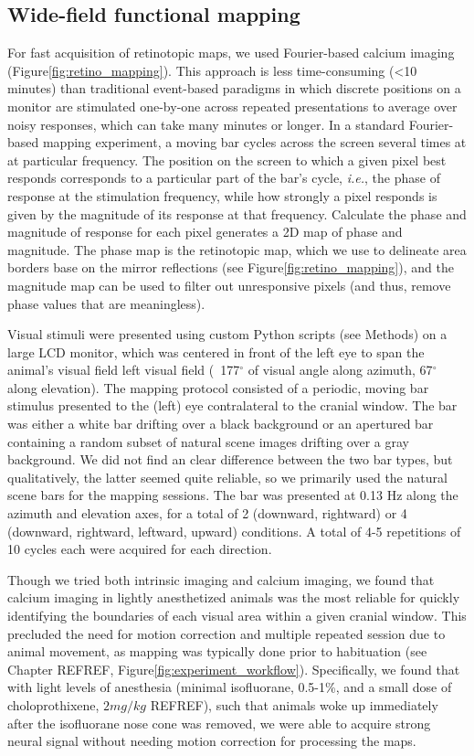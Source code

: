 \subsection{Wide-field functional mapping}
For fast acquisition of retinotopic maps, we used Fourier-based calcium imaging\cite{Kalatsky2003} (Figure\ref{fig:retino_mapping}). This approach is less time-consuming (<10 minutes) than traditional event-based paradigms in which discrete positions on a monitor are stimulated one-by-one across repeated presentations to average over noisy responses, which can take many minutes or longer. In a standard Fourier-based mapping experiment, a moving bar cycles across the screen several times at at particular frequency. The position on the screen to which a given pixel best responds corresponds to a particular part of the bar's cycle, \textit{i.e.}, the phase of response at the stimulation frequency, while how strongly a pixel responds is given by the magnitude of its response at that frequency. Calculate the phase and magnitude of response for each pixel generates a 2D map of phase and magnitude. The phase map is the retinotopic map, which we use to delineate area borders base on the mirror reflections (see Figure\ref{fig:retino_mapping}), and the magnitude map can be used to filter out unresponsive pixels (and thus, remove phase values that are meaningless). 

Visual stimuli were presented using custom Python scripts (see Methods) on a large LCD monitor, which was centered in front of the left eye to span the animal's visual field left visual field (~177$^{\circ}$ of visual angle along azimuth, 67$^{\circ}$ along elevation). The mapping protocol consisted of a periodic, moving bar stimulus\cite{Kalatsky2003, Marshel2011} presented to the (left) eye contralateral to the cranial window. The bar was either a white bar drifting over a black background or an apertured bar containing a random subset of natural scene images drifting over a gray background. We did not find an clear difference between the two bar types, but qualitatively, the latter seemed quite reliable, so we primarily used the natural scene bars for the mapping sessions. The bar was presented at 0.13 Hz along the azimuth and elevation axes, for a total of 2 (downward, rightward) or 4 (downward, rightward, leftward, upward) conditions. A total of 4-5 repetitions of 10 cycles each were acquired for each direction. 

Though we tried both intrinsic imaging and calcium imaging, we found that calcium imaging in lightly anesthetized animals was the most reliable for quickly identifying the boundaries of each visual area within a given cranial window. This precluded the need for motion correction and multiple repeated session due to animal movement, as mapping was typically done prior to habituation (see Chapter REFREF, Figure\ref{fig:experiment_workflow}). Specifically, we found that with light levels of anesthesia (minimal isofluorane, 0.5-1\%, and a small dose of choloprothixene, $2mg/kg$ REFREF), such that animals woke up immediately after the isofluorane nose cone was removed, we were able to acquire strong neural signal without needing motion correction for processing the maps.

